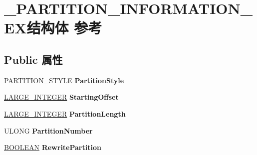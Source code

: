 \hypertarget{struct___p_a_r_t_i_t_i_o_n___i_n_f_o_r_m_a_t_i_o_n___e_x}{}\section{\+\_\+\+P\+A\+R\+T\+I\+T\+I\+O\+N\+\_\+\+I\+N\+F\+O\+R\+M\+A\+T\+I\+O\+N\+\_\+\+E\+X结构体 参考}
\label{struct___p_a_r_t_i_t_i_o_n___i_n_f_o_r_m_a_t_i_o_n___e_x}
\subsection*{Public 属性}
\begin{DoxyCompactItemize}
\item 
\mbox{\label{struct___p_a_r_t_i_t_i_o_n___i_n_f_o_r_m_a_t_i_o_n___e_x_a5bcad454829aecc573fc3ce582aa5c3c}} 
P\+A\+R\+T\+I\+T\+I\+O\+N\+\_\+\+S\+T\+Y\+LE {\bfseries Partition\+Style}
\item 
\mbox{\label{struct___p_a_r_t_i_t_i_o_n___i_n_f_o_r_m_a_t_i_o_n___e_x_a377b4352caf8c324472fe55d23e8a11b}} 
\hyperlink{union___l_a_r_g_e___i_n_t_e_g_e_r}{L\+A\+R\+G\+E\+\_\+\+I\+N\+T\+E\+G\+ER} {\bfseries Starting\+Offset}
\item 
\mbox{\label{struct___p_a_r_t_i_t_i_o_n___i_n_f_o_r_m_a_t_i_o_n___e_x_af5d6a40b9b83893ff842594e4e958b3d}} 
\hyperlink{union___l_a_r_g_e___i_n_t_e_g_e_r}{L\+A\+R\+G\+E\+\_\+\+I\+N\+T\+E\+G\+ER} {\bfseries Partition\+Length}
\item 
\mbox{\label{struct___p_a_r_t_i_t_i_o_n___i_n_f_o_r_m_a_t_i_o_n___e_x_a73879ed7ea44f15a4b34ce0d47385f15}} 
U\+L\+O\+NG {\bfseries Partition\+Number}
\item 
\mbox{\label{struct___p_a_r_t_i_t_i_o_n___i_n_f_o_r_m_a_t_i_o_n___e_x_a1f2f6d35cbf981a8a335b842f0f6503f}} 
\hyperlink{_processor_bind_8h_a112e3146cb38b6ee95e64d85842e380a}{B\+O\+O\+L\+E\+AN} {\bfseries Rewrite\+Partition}
\item 

\end{DoxyCompactItemize}
